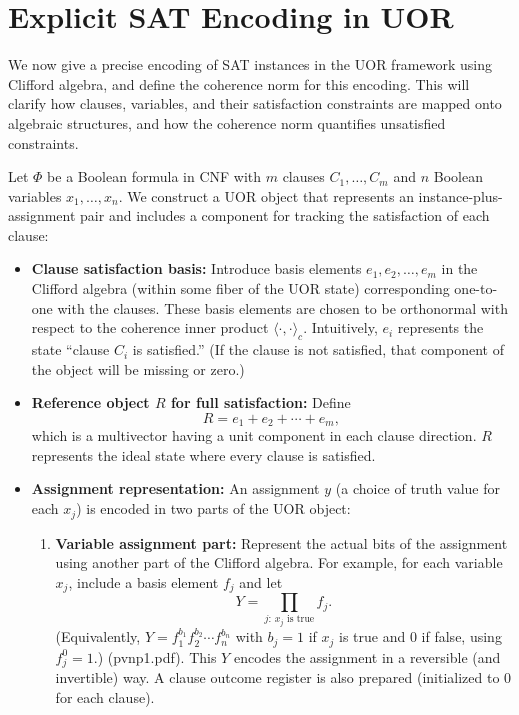 \documentclass{article}
\begin{document}
\section{Explicit SAT Encoding in UOR}

We now give a precise encoding of SAT instances in the UOR framework using Clifford algebra, and define the coherence norm for this encoding. This will clarify how clauses, variables, and their satisfaction constraints are mapped onto algebraic structures, and how the coherence norm quantifies unsatisfied constraints.

Let $\Phi$ be a Boolean formula in CNF with $m$ clauses $C_1,\dots, C_m$ and $n$ Boolean variables $x_1,\dots,x_n$. We construct a UOR object that represents an instance-plus-assignment pair and includes a component for tracking the satisfaction of each clause:
\begin{itemize}
    \item \textbf{Clause satisfaction basis:} Introduce basis elements $e_1, e_2, \dots, e_m$ in the Clifford algebra (within some fiber of the UOR state) corresponding one-to-one with the clauses. These basis elements are chosen to be orthonormal with respect to the coherence inner product $\langle \cdot,\cdot \rangle_c$. Intuitively, $e_i$ represents the state ``clause $C_i$ is satisfied.'' (If the clause is not satisfied, that component of the object will be missing or zero.)
    \item \textbf{Reference object $R$ for full satisfaction:} Define 
    \[
    R = e_1 + e_2 + \cdots + e_m,
    \]
    which is a multivector having a unit component in each clause direction. $R$ represents the ideal state where every clause is satisfied.
    \item \textbf{Assignment representation:} An assignment $y$ (a choice of truth value for each $x_j$) is encoded in two parts of the UOR object:
    \begin{enumerate}
        \item \textbf{Variable assignment part:} Represent the actual bits of the assignment using another part of the Clifford algebra. For example, for each variable $x_j$, include a basis element $f_j$ and let 
        \[
        Y = \prod_{j:\, x_j \text{ is true}} f_j.
        \]
        (Equivalently, $Y = f_1^{b_1} f_2^{b_2}\cdots f_n^{b_n}$ with $b_j=1$ if $x_j$ is true and $0$ if false, using $f_j^0=1$.) (pvnp1.pdf). This $Y$ encodes the assignment in a reversible (and invertible) way. A clause outcome register is also prepared (initialized to 0 for each clause).

\end{enumerate}
\end{itemize}
\end{document}
